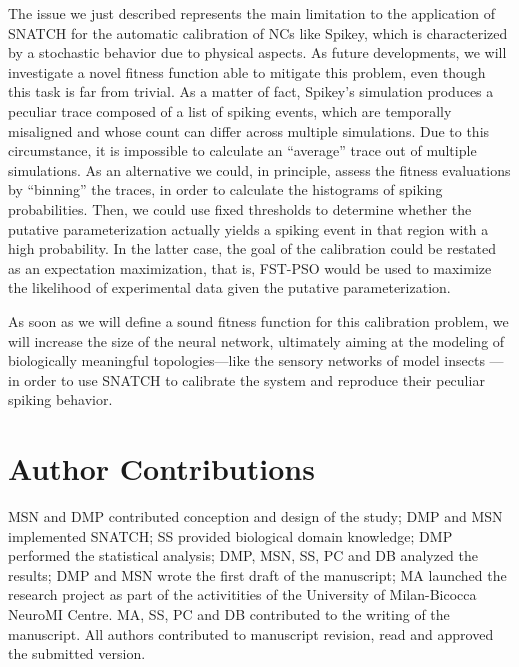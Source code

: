 \documentclass[utf8]{frontiersFPHY} %
\newcommand {\name}{SNATCH}
\begin{document}
The issue we just described represents the main limitation to the application of \name{} for the automatic calibration of NCs like Spikey, which is characterized by a stochastic behavior due to physical aspects. 
As future developments, we will investigate a novel fitness function able to mitigate this problem, even though this task is far from trivial.
As a matter of fact, Spikey's simulation produces a peculiar trace composed of a list of spiking events, which are temporally misaligned and whose count
can differ across multiple simulations. 
Due to this circumstance, it is impossible to calculate an ``average'' trace out of multiple simulations.
As an alternative we could, in principle, assess the fitness evaluations by ``binning'' the traces, in order to calculate the histograms of spiking probabilities.
Then, we could use fixed thresholds to determine whether the putative parameterization actually yields a spiking event in that region with a high probability. 
In the latter case, the goal of the calibration could be restated as an expectation maximization, that is, FST-PSO
would be used to maximize the likelihood of experimental data given the putative parameterization.

As soon as we will define a sound fitness function for this calibration problem, we will increase the size of the neural network,
ultimately aiming at the modeling of biologically meaningful topologies---like the sensory networks of model insects  \cite{namiki2009reconstruction,Pfeil2013}---in order to use \name{} to calibrate the system and reproduce their peculiar spiking behavior.

\section*{Author Contributions}
MSN and DMP contributed conception and design of the study; DMP and MSN implemented SNATCH; SS provided biological domain knowledge; DMP performed the statistical analysis; DMP, MSN, SS, PC and DB analyzed the results; DMP and MSN wrote the first draft of the manuscript; MA launched the research project as part of the activitities of the University of Milan-Bicocca NeuroMI Centre. MA, SS, PC and DB contributed to the writing of the manuscript. All authors contributed to manuscript revision, read and approved the submitted version.
\end{document}
